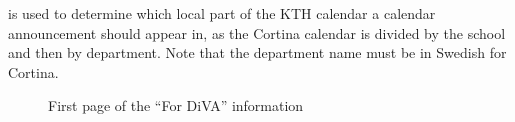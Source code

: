 \noindent is used to determine which local part of the KTH calendar a calendar announcement should appear in, as the Cortina calendar is divided by the school and then by department. Note that the department name must be in Swedish for Cortina.
\clearpage
\begin{figure}[!ht]
  \begin{center}
  \end{center}
  \caption{First page of the “For DiVA” information}
  \label{fig:sampleFOrDIVApage1}
\end{figure}
\clearpage
